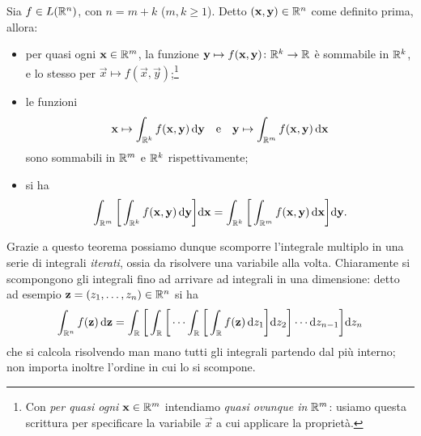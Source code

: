 \begin{teorema}[di Fubini] \label{t:fubini}
	Sia $f\in L(\mathbb{R}^n)$, con $n=m+k$ ($m,k\geq 1$).
	Detto $(\mathbf{x},\mathbf{y})\in\mathbb{R}^n$ come definito prima, allora:
	\begin{itemize}
		\item per quasi ogni $\mathbf{x}\in\mathbb{R}^m$, la funzione $\mathbf{y}\mapsto f(\mathbf{x},\mathbf{y})\colon\mathbb{R}^k\to\mathbb{R}$ è sommabile in $\mathbb{R}^k$, e lo stesso per $\vec x\mapsto f(\vec x,\vec y)$;\footnote{Con \emph{per quasi ogni $\mathbf{x}\in\mathbb{R}^m$} intendiamo \emph{quasi ovunque in $\mathbb{R}^m$}: usiamo questa scrittura per specificare la variabile $\vec x$ a cui applicare la proprietà.}
		\item le funzioni
			\begin{equation*}
				\mathbf{x}\mapsto\int_{\mathbb{R}^k}f(\mathbf{x},\mathbf{y})\,\textup{d}\mathbf{y}\quad\text{e}\quad\mathbf{y}\mapsto\int_{\mathbb{R}^m}f(\mathbf{x},\mathbf{y})\,\textup{d}\mathbf{x}
			\end{equation*}
			sono sommabili in $\mathbb{R}^m$ e $\mathbb{R}^k$ rispettivamente;
		\item si ha
			\begin{equation*}
				\int_{\mathbb{R}^m}\bigg[\int_{\mathbb{R}^k}f(\mathbf{x},\mathbf{y})\,\textup{d}\mathbf{y}\bigg]\textup{d}\mathbf{x}=\int_{\mathbb{R}^k}\bigg[\int_{\mathbb{R}^m}f(\mathbf{x},\mathbf{y})\,\textup{d}\mathbf{x}\bigg]\textup{d}\mathbf{y}.
			\end{equation*}
	\end{itemize}
\end{teorema}
Grazie a questo teorema possiamo dunque scomporre l'integrale multiplo in una serie di integrali \emph{iterati}, ossia da risolvere una variabile alla volta.
Chiaramente si scompongono gli integrali fino ad arrivare ad integrali in una dimensione: detto ad esempio $\mathbf{z}=(z_1,\dots,z_n)\in\mathbb{R}^n$ si ha
\begin{equation*}
	\int_{\mathbb{R}^n}f(\mathbf{z})\,\textup{d}\mathbf{z}=\int_{\mathbb{R}}\bigg[\int_{\mathbb{R}}\bigg[\cdots\int_{\mathbb{R}}\bigg[\int_{\mathbb{R}} f(\mathbf{z})\,\textup{d} z_1\bigg]\textup{d} z_2\bigg]\cdots\textup{d} z_{n-1}\bigg]\textup{d} z_n
\end{equation*}
che si calcola risolvendo man mano tutti gli integrali partendo dal più interno; non importa inoltre l'ordine in cui lo si scompone.

